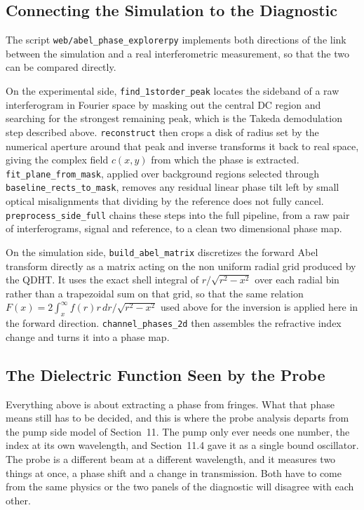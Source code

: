 \subsection{Connecting the Simulation to the Diagnostic}

The script \texttt{web/abel\_phase\_explorer\dotb py} implements both directions of the link between the simulation and a real interferometric measurement, so that the two can be compared directly.

On the experimental side, \texttt{find\_1storder\_peak} locates the sideband of a raw interferogram in Fourier space by masking out the central DC region and searching for the strongest remaining peak, which is the Takeda demodulation step described above. \texttt{reconstruct} then crops a disk of radius set by the numerical aperture around that peak and inverse transforms it back to real space, giving the complex field $c(x,y)$ from which the phase is extracted. \texttt{fit\_plane\_from\_mask}, applied over background regions selected through \texttt{baseline\_rects\_to\_mask}, removes any residual linear phase tilt left by small optical misalignments that dividing by the reference does not fully cancel. \texttt{preprocess\_side\_full} chains these steps into the full pipeline, from a raw pair of interferograms, signal and reference, to a clean two dimensional phase map.

On the simulation side, \texttt{build\_abel\_matrix} discretizes the forward Abel transform directly as a matrix acting on the non uniform radial grid produced by the QDHT. It uses the exact shell integral of $r/\sqrt{r^2-x^2}$ over each radial bin rather than a trapezoidal sum on that grid, so that the same relation $F(x)=2\int_x^\infty f(r)r\,dr/\sqrt{r^2-x^2}$ used above for the inversion is applied here in the forward direction. \texttt{channel\_phases\_2d} then assembles the refractive index change and turns it into a phase map.

\subsection{The Dielectric Function Seen by the Probe}

Everything above is about extracting a phase from fringes. What that phase means still has to be decided, and this is where the probe analysis departs from the pump side model of Section~11. The pump only ever needs one number, the index at its own wavelength, and Section~11.4 gave it as a single bound oscillator. The probe is a different beam at a different wavelength, and it measures two things at once, a phase shift and a change in transmission. Both have to come from the same physics or the two panels of the diagnostic will disagree with each other.

